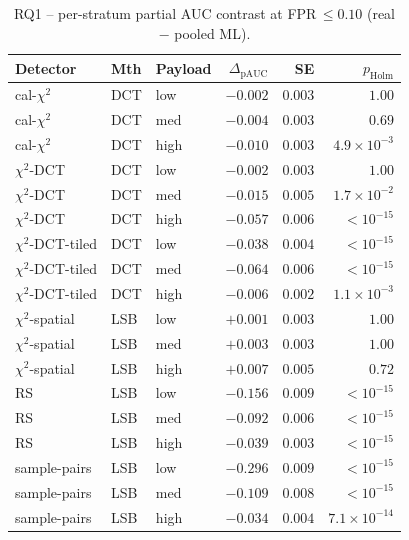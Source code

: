 \documentclass[10pt,twocolumn,a4paper]{article}
\begin{document}
\begin{table}[!htbp]
\centering\footnotesize
\caption{RQ1 -- per-stratum partial AUC contrast at FPR\,$\leq\!0.10$ (real $-$ pooled ML).}
\label{tab:appendix-pauc}
\setlength{\tabcolsep}{4pt}\renewcommand{\arraystretch}{1.1}
\begin{tabular}{@{}l l l r r r@{}}
\toprule
\textbf{Detector} & \textbf{Mth} & \textbf{Payload} & \textbf{$\Delta_\text{pAUC}$} & \textbf{SE} & \textbf{$p_\text{Holm}$} \\
\midrule
cal-$\chi^2$         & DCT & low    & $-0.002$ & $0.003$ & $1.00$ \\
cal-$\chi^2$         & DCT & med    & $-0.004$ & $0.003$ & $0.69$ \\
cal-$\chi^2$         & DCT & high   & $-0.010$ & $0.003$ & $4.9\!\times\!10^{-3}$ \\
$\chi^2$-DCT         & DCT & low    & $-0.002$ & $0.003$ & $1.00$ \\
$\chi^2$-DCT         & DCT & med    & $-0.015$ & $0.005$ & $1.7\!\times\!10^{-2}$ \\
$\chi^2$-DCT         & DCT & high   & $-0.057$ & $0.006$ & $<\!10^{-15}$ \\
$\chi^2$-DCT-tiled   & DCT & low    & $-0.038$ & $0.004$ & $<\!10^{-15}$ \\
$\chi^2$-DCT-tiled   & DCT & med    & $-0.064$ & $0.006$ & $<\!10^{-15}$ \\
$\chi^2$-DCT-tiled   & DCT & high   & $-0.006$ & $0.002$ & $1.1\!\times\!10^{-3}$ \\
$\chi^2$-spatial     & LSB & low    & $+0.001$ & $0.003$ & $1.00$ \\
$\chi^2$-spatial     & LSB & med    & $+0.003$ & $0.003$ & $1.00$ \\
$\chi^2$-spatial     & LSB & high   & $+0.007$ & $0.005$ & $0.72$ \\
RS                   & LSB & low    & $-0.156$ & $0.009$ & $<\!10^{-15}$ \\
RS                   & LSB & med    & $-0.092$ & $0.006$ & $<\!10^{-15}$ \\
RS                   & LSB & high   & $-0.039$ & $0.003$ & $<\!10^{-15}$ \\
sample-pairs         & LSB & low    & $-0.296$ & $0.009$ & $<\!10^{-15}$ \\
sample-pairs         & LSB & med    & $-0.109$ & $0.008$ & $<\!10^{-15}$ \\
sample-pairs         & LSB & high   & $-0.034$ & $0.004$ & $7.1\!\times\!10^{-14}$ \\
\bottomrule
\end{tabular}
\end{table}
\end{document}
